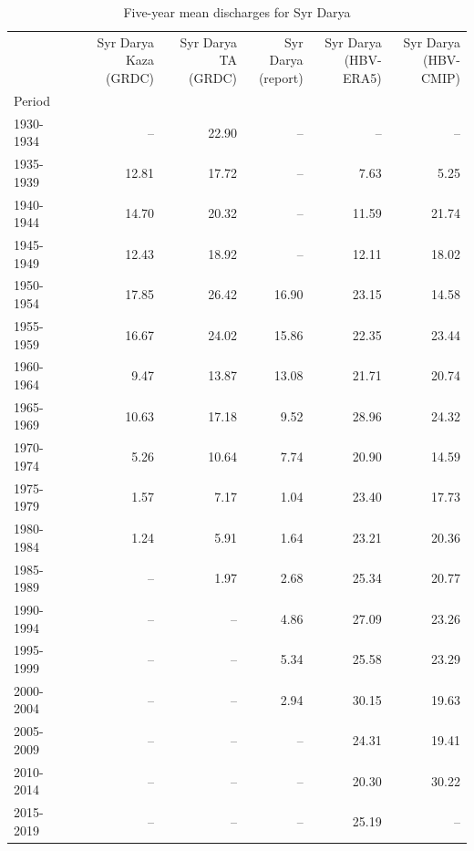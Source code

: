\begin{small}
\begin{table}
\caption{Five-year mean discharges for Syr Darya}
\label{tab:syr_darya_discharge}
\begin{tabular}{lrrrrr}
\toprule
 & \makecell{Syr Darya Kaza\\(GRDC)} & \makecell{Syr Darya TA\\(GRDC)} & \makecell{Syr Darya\\(report)} & \makecell{Syr Darya\\(HBV-ERA5)} & \makecell{Syr Darya\\(HBV-CMIP)} \\
Period &  &  &  &  &  \\
\midrule
1930-1934 & -- & 22.90 & -- & -- & -- \\
1935-1939 & 12.81 & 17.72 & -- & 7.63 & 5.25 \\
1940-1944 & 14.70 & 20.32 & -- & 11.59 & 21.74 \\
1945-1949 & 12.43 & 18.92 & -- & 12.11 & 18.02 \\
1950-1954 & 17.85 & 26.42 & 16.90 & 23.15 & 14.58 \\
1955-1959 & 16.67 & 24.02 & 15.86 & 22.35 & 23.44 \\
1960-1964 & 9.47 & 13.87 & 13.08 & 21.71 & 20.74 \\
1965-1969 & 10.63 & 17.18 & 9.52 & 28.96 & 24.32 \\
1970-1974 & 5.26 & 10.64 & 7.74 & 20.90 & 14.59 \\
1975-1979 & 1.57 & 7.17 & 1.04 & 23.40 & 17.73 \\
1980-1984 & 1.24 & 5.91 & 1.64 & 23.21 & 20.36 \\
1985-1989 & -- & 1.97 & 2.68 & 25.34 & 20.77 \\
1990-1994 & -- & -- & 4.86 & 27.09 & 23.26 \\
1995-1999 & -- & -- & 5.34 & 25.58 & 23.29 \\
2000-2004 & -- & -- & 2.94 & 30.15 & 19.63 \\
2005-2009 & -- & -- & -- & 24.31 & 19.41 \\
2010-2014 & -- & -- & -- & 20.30 & 30.22 \\
2015-2019 & -- & -- & -- & 25.19 & -- \\
\bottomrule
\end{tabular}
\end{table}

\end{small}